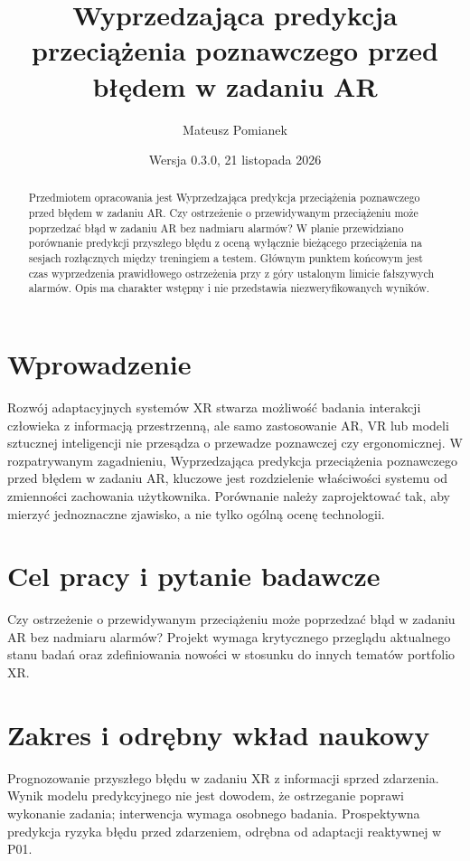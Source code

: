 \documentclass[11pt,a4paper]{article}
\title{Wyprzedzająca predykcja przeciążenia poznawczego przed błędem w zadaniu AR}
\author{Mateusz Pomianek}
\date{Wersja 0.3.0, 21 listopada 2026}
\begin{document}
\maketitle

\begin{abstract}

Przedmiotem opracowania jest Wyprzedzająca predykcja przeciążenia poznawczego przed błędem w zadaniu AR. Czy ostrzeżenie o przewidywanym przeciążeniu może poprzedzać błąd w zadaniu AR bez nadmiaru alarmów? W planie przewidziano porównanie predykcji przyszłego błędu z oceną wyłącznie bieżącego przeciążenia na sesjach rozłącznych między treningiem a testem. Głównym punktem końcowym jest czas wyprzedzenia prawidłowego ostrzeżenia przy z góry ustalonym limicie fałszywych alarmów. Opis ma charakter wstępny i nie przedstawia niezweryfikowanych wyników.

\end{abstract}

\section{Wprowadzenie}

Rozwój adaptacyjnych systemów XR stwarza możliwość badania interakcji człowieka z informacją przestrzenną, ale samo zastosowanie AR, VR lub modeli sztucznej inteligencji nie przesądza o przewadze poznawczej czy ergonomicznej. W rozpatrywanym zagadnieniu, Wyprzedzająca predykcja przeciążenia poznawczego przed błędem w zadaniu AR, kluczowe jest rozdzielenie właściwości systemu od zmienności zachowania użytkownika. Porównanie należy zaprojektować tak, aby mierzyć jednoznaczne zjawisko, a nie tylko ogólną ocenę technologii.

\section{Cel pracy i pytanie badawcze}

Czy ostrzeżenie o przewidywanym przeciążeniu może poprzedzać błąd w zadaniu AR bez nadmiaru alarmów? Projekt wymaga krytycznego przeglądu aktualnego stanu badań oraz zdefiniowania nowości w stosunku do innych tematów portfolio XR.

\section{Zakres i odrębny wkład naukowy}
Prognozowanie przyszłego błędu w zadaniu XR z informacji sprzed zdarzenia. Wynik modelu predykcyjnego nie jest dowodem, że ostrzeganie poprawi wykonanie zadania; interwencja wymaga osobnego badania. Prospektywna predykcja ryzyka błędu przed zdarzeniem, odrębna od adaptacji reaktywnej w P01.
\end{document}
